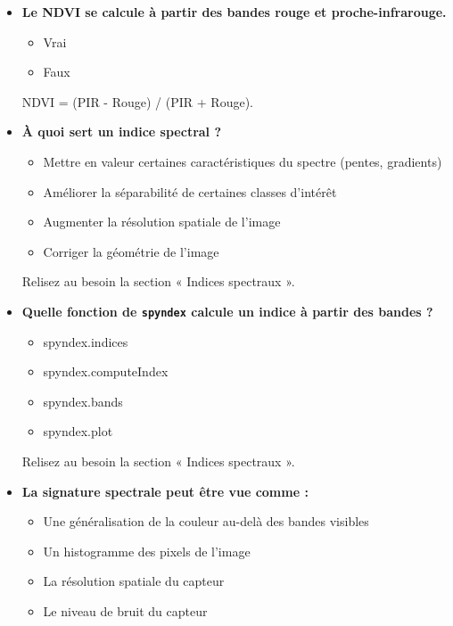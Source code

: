 \documentclass[
  french,
  11pt,
  letterpaper,
  open=any,
  twoside=false,
  french]{scrbook}
\providecommand{\tightlist}{%
  \setlength{\itemsep}{0pt}\setlength{\parskip}{0pt}}
\begin{document}
\begin{itemize}
  Relisez au besoin le tableau des noms de bandes Sentinel-2.
\item
  \textbf{Le NDVI se calcule à partir des bandes rouge et
  proche-infrarouge.}

  \begin{itemize}
  \tightlist
  \item
    Vrai
  \item
    Faux
  \end{itemize}

  NDVI = (PIR - Rouge) / (PIR + Rouge).
\item
  \textbf{À quoi sert un indice spectral ?}

  \begin{itemize}
  \tightlist
  \item
    Mettre en valeur certaines caractéristiques du spectre (pentes,
    gradients)
  \item
    Améliorer la séparabilité de certaines classes d'intérêt
  \item
    Augmenter la résolution spatiale de l'image
  \item
    Corriger la géométrie de l'image
  \end{itemize}

  Relisez au besoin la section « Indices spectraux ».
\item
  \textbf{Quelle fonction de \texttt{spyndex} calcule un indice à partir
  des bandes ?}

  \begin{itemize}
  \tightlist
  \item
    spyndex.indices
  \item
    spyndex.computeIndex
  \item
    spyndex.bands
  \item
    spyndex.plot
  \end{itemize}

  Relisez au besoin la section « Indices spectraux ».
\item
  \textbf{La signature spectrale peut être vue comme :}

  \begin{itemize}
  \tightlist
  \item
    Une généralisation de la couleur au-delà des bandes visibles
  \item
    Un histogramme des pixels de l'image
  \item
    La résolution spatiale du capteur
  \item
    Le niveau de bruit du capteur
  \end{itemize}


\end{itemize}
\end{document}
